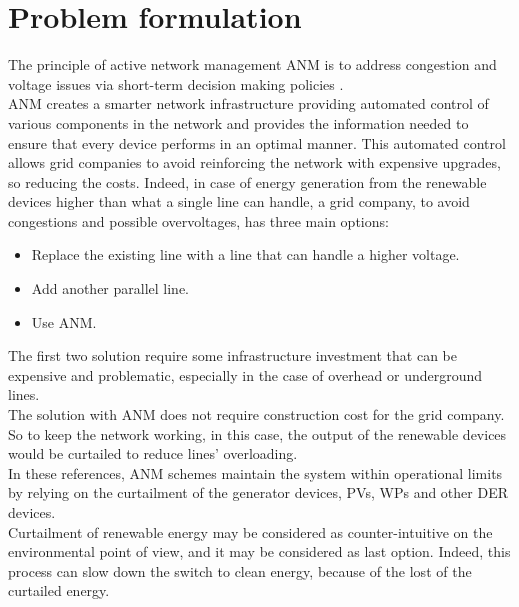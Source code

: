 \chapter{Problem formulation}
\label{chapter4}
The principle of active network management \gls{ANM} is to address congestion and voltage issues via short-term decision making policies \cite{ANMQuentin}. \\
\gls{ANM} creates a smarter network infrastructure providing automated control of various components in the network and provides the information needed to ensure that every device performs in an optimal manner. This automated control allows grid companies to avoid reinforcing the network with expensive upgrades, so reducing the costs.
Indeed, in case of energy generation from the renewable devices higher than what a single line can handle, a grid company, to avoid congestions and possible overvoltages, has three main options:
\begin{itemize}
    \item Replace the existing line with a line that can handle a higher voltage.
    \item Add another parallel line.
    \item Use \gls{ANM}.
\end{itemize}
The first two solution require some infrastructure investment that can be expensive and problematic, especially in the case of overhead or underground lines.\\
The solution with \gls{ANM} does not require construction cost for the grid company. So to keep the network working, in this case, the output of the renewable devices would be curtailed to reduce lines' overloading. \\

In these references, \gls{ANM} schemes maintain the system within operational limits by relying on the curtailment of the generator devices, \glspl{PV}, \glspl{WP} and other \gls{DER} devices. \\
Curtailment of renewable energy may be considered as counter-intuitive on the environmental point of view, and it may be considered as last option. Indeed, this process can slow down the switch to clean energy, because of the lost of the curtailed energy. \\


